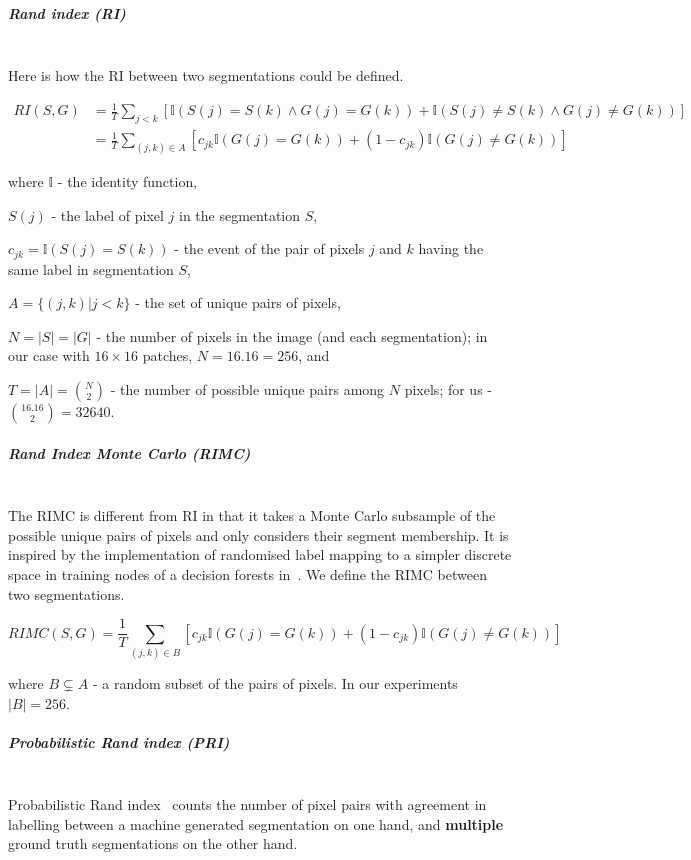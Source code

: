 \subparagraph*{Rand index (RI)}\mbox{}\\
Here is how the RI between two segmentations could be defined.

\begin{align*}
RI(S,G) & =\frac{1}{T}\sum\limits _{j<k}\left[\mathbb{I}\left(S(j)=S(k)\wedge G(j)=G(k)\right)+\mathbb{I}\left(S(j)\neq S(k)\wedge G(j)\neq G(k)\right)\right]\\
 & =\frac{1}{T}\sum\limits _{(j,k)\in A}\left[c_{jk}\mathbb{I}\left(G(j)=G(k)\right)+(1-c_{jk})\mathbb{I}\left(G(j)\neq G(k)\right)\right]
\end{align*}

where $\mathbb{I}$ - the identity function,

$S(j)$ - the label of pixel $j$ in the segmentation $S$,

$c_{jk}=\mathbb{I}\left(S(j)=S(k)\right)$ - the event of the pair
of pixels $j$ and $k$ having the same label in segmentation $S$,

$A=\{(j,k)|j<k\}$ - the set of unique pairs of pixels,

$N=\left|S\right|=\left|G\right|$ - the number of pixels in the image
(and each segmentation); in our case with $16\times 16$ patches, $N=16 . 16 = 256$, and 

$T=|A|=\binom{N}{2}$ - the number of possible unique pairs among
$N$ pixels; for us - $\binom{16 . 16}{2}=32 640$.


\subparagraph*{Rand Index Monte Carlo (RIMC)}\mbox{}\\ %
\label{sec:ch4-RIMC-maths}
The RIMC is different from RI in that it takes a Monte Carlo subsample of the possible unique pairs of pixels and only considers their segment membership. It is inspired by the implementation of randomised label mapping to a simpler discrete space in training nodes of a decision forests in~\cite{DollarICCV13edges}. We define the RIMC between two segmentations.

\[
RIMC(S,G)=\frac{1}{T}\sum\limits _{(j,k)\in B}\left[c_{jk}\mathbb{I}\left(G(j)=G(k)\right)+(1-c_{jk})\mathbb{I}\left(G(j)\neq G(k)\right)\right]
\]

where $B\subsetneq A$ - a random subset of the pairs of pixels.
In our experiments $|B|=256$.


\subparagraph*{Probabilistic Rand index (PRI)}\mbox{}\\
Probabilistic Rand index~\cite{UnnikrishnanPH07} counts the number of pixel pairs with agreement in %
labelling between a machine generated segmentation on one hand, and \textbf{multiple} ground truth segmentations on the other hand.

